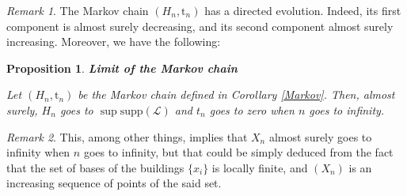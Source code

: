 \documentclass[10pt,english,a4paper]{smfart}
\newtheorem{proposition}{Proposition}[section]
\theoremstyle{definition}
\theoremstyle{remark}
\newtheorem{remark}{Remark}
\begin{document}
\begin{remark}
The Markov chain $(H_n, \mathrm{t}_n)$ has a directed evolution. Indeed, its first component is almost surely decreasing, and its second component almost surely increasing. Moreover, we have the following:
\end{remark}

\begin{proposition}\textbf{Limit of the Markov chain}\label{limite}

Let $(H_n, \mathrm{t}_n)$ be the Markov chain defined in Corollary \ref{Markov}. Then, almost surely, $H_n$ goes to $\sup \mathrm{supp}(\mathcal{L})$ and $t_n$ goes to zero when $n$ goes to infinity.
\end{proposition}
\begin{remark}
This, among other things, implies that $X_n$ almost surely goes to infinity when $n$ goes to infinity, but that could be simply deduced from the fact that the set of bases of the buildings $\{x_i\}$ is locally finite, and $(X_n)$ is an increasing sequence of points of the said set.
\end{remark}
\end{document}
